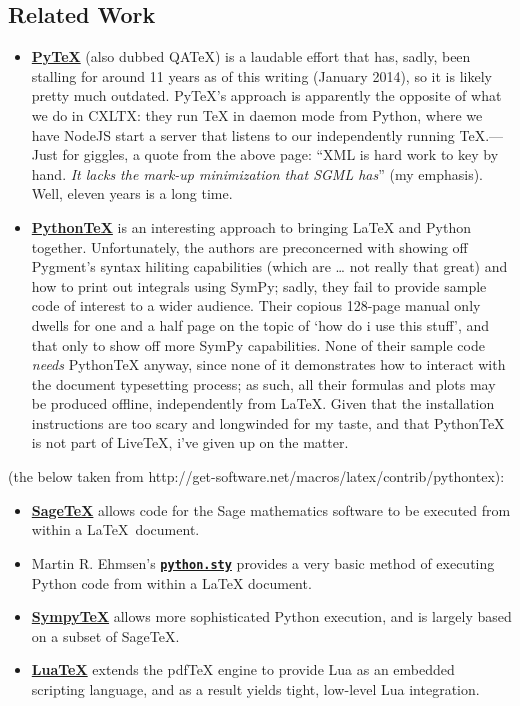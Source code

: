 \subsection{Related Work}\label{related-work}

\begin{itemize}
\item
  \href{http://www.pytex.org/}{\textbf{PyTeX}} (also dubbed QATeX) is a
  laudable effort that has, sadly, been stalling for around 11 years as
  of this writing (January 2014), so it is likely pretty much outdated.
  PyTeX's approach is apparently the opposite of what we do in CXLTX:
  they run TeX in daemon mode from Python, where we have NodeJS start a
  server that listens to our independently running TeX.---Just for
  giggles, a quote from the above page: ``XML is hard work to key by
  hand. \emph{It lacks the mark-up minimization that SGML has}'' (my
  emphasis). Well, eleven years is a long time.
\item
  \href{https://github.com/gpoore/pythontex}{\textbf{PythonTeX}} is an
  interesting approach to bringing LaTeX and Python together.
  Unfortunately, the authors are preconcerned with showing off Pygment's
  syntax hiliting capabilities (which are \ldots{} not really that
  great) and how to print out integrals using SymPy; sadly, they fail to
  provide sample code of interest to a wider audience. Their copious
  128-page manual only dwells for one and a half page on the topic of
  `how do i use this stuff', and that only to show off more SymPy
  capabilities. None of their sample code \emph{needs} PythonTeX anyway,
  since none of it demonstrates how to interact with the document
  typesetting process; as such, all their formulas and plots may be
  produced offline, independently from LaTeX. Given that the
  installation instructions are too scary and longwinded for my taste,
  and that PythonTeX is not part of LiveTeX, i've given up on the
  matter.
\end{itemize}

(the below taken from
http://get-software.net/macros/latex/contrib/pythontex):

\begin{itemize}
\item
  \href{http://www.ctan.org/tex-archive/macros/latex/contrib/sagetex}{\textbf{SageTeX}}
  allows code for the Sage mathematics software to be executed from
  within a \LaTeX~document.
\item
  Martin R. Ehmsen's
  \href{http://www.ctan.org/pkg/python}{\textbf{\texttt{python.sty}}}
  provides a very basic method of executing Python code from within a
  LaTeX document.
\item
  \href{http://elec.otago.ac.nz/w/index.php/SympyTeX}{\textbf{SympyTeX}}
  allows more sophisticated Python execution, and is largely based on a
  subset of SageTeX.
\item
  \href{http://www.luatex.org/}{\textbf{LuaTeX}} extends the pdfTeX
  engine to provide Lua as an embedded scripting language, and as a
  result yields tight, low-level Lua integration.
\end{itemize}

